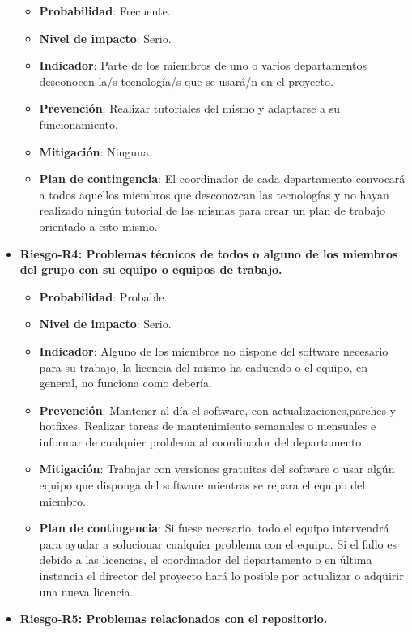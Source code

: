 \begin{itemize}
		\begin{itemize}	
		\item{ \bf Probabilidad}: Frecuente.
		\item{ \bf Nivel de impacto}: Serio.
		\item{ \bf Indicador}: Parte de los miembros de uno o varios departamentos desconocen la/s tecnología/s que se usará/n en el proyecto.
		\item{ \bf Prevención}: Realizar tutoriales del mismo y adaptarse a su funcionamiento.
		\item{ \bf Mitigación}: Ninguna.
		\item{ \bf Plan de contingencia}: El coordinador de cada departamento convocará a todos aquellos miembros que desconozcan las tecnologías y no hayan realizado ningún tutorial de las mismas para crear un plan de trabajo orientado a esto mismo.\\
		\end{itemize}
\item { \bf Riesgo-R4: Problemas técnicos de todos o alguno de los miembros del grupo con su equipo o equipos de trabajo.}
		\begin{itemize}	
		\item{ \bf Probabilidad}: Probable.
		\item{ \bf Nivel de impacto}: Serio.
		\item{ \bf Indicador}: Alguno de los miembros no dispone del software necesario para su trabajo, la licencia del mismo ha caducado o el equipo, en general, no funciona como debería.
		\item{ \bf Prevención}: Mantener al día el software, con actualizaciones,parches y hotfixes. Realizar tareas de mantenimiento semanales o mensuales e informar de cualquier problema al coordinador del departamento.
		\item{ \bf Mitigación}: Trabajar con versiones gratuitas del software o usar algún equipo que disponga del software mientras se repara el equipo del miembro.
		\item{ \bf Plan de contingencia}: Si fuese necesario, todo el equipo intervendrá para ayudar a solucionar cualquier problema con el equipo. Si el fallo es debido a las licencias, el coordinador del departamento o en última instancia el director del proyecto hará lo posible por actualizar o adquirir una nueva licencia.\\
		\end{itemize}
\item { \bf Riesgo-R5: Problemas relacionados con el repositorio.}

\end{itemize}

